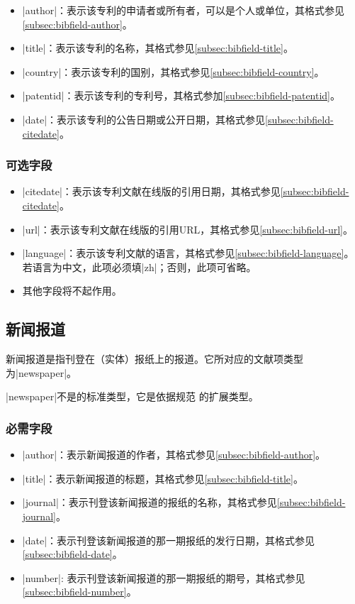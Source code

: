 \begin{itemize}
\item |author|：表示该专利的申请者或所有者，可以是个人或单位，其格式参见
  \ref{subsec:bibfield-author}。
\item |title|：表示该专利的名称，其格式参见\ref{subsec:bibfield-title}。
\item |country|：表示该专利的国别，其格式参见\ref{subsec:bibfield-country}。
\item |patentid|：表示该专利的专利号，其格式参加\ref{subsec:bibfield-patentid}。
\item |date|：表示该专利的公告日期或公开日期，其格式参见\ref{subsec:bibfield-citedate}。
\end{itemize}

\subsubsection{可选字段}

\begin{itemize}
\item |citedate|：表示该专利文献在线版的引用日期，其格式参见\ref{subsec:bibfield-citedate}。
\item |url|：表示该专利文献在线版的引用URL，其格式参见\ref{subsec:bibfield-url}。
\item |language|：表示该专利文献的语言，其格式参见\ref{subsec:bibfield-language}。
  若语言为中文，此项必须填|zh|；否则，此项可省略。
\item 其他字段将不起作用。
\end{itemize}

\subsection{新闻报道}\label{subsec:bibtype-newspaper}

新闻报道是指刊登在（实体）报纸上的报道。它所对应的{\BibTeX}文献项类型为|newspaper|。

|newspaper|不是{\BibTeX}的标准类型，它是依据规范
\cite{gbt7714-2005}的扩展类型。

\subsubsection{必需字段}

\begin{itemize}
\item |author|：表示新闻报道的作者，其格式参见\ref{subsec:bibfield-author}。
\item |title|：表示新闻报道的标题，其格式参见\ref{subsec:bibfield-title}。
\item |journal|：表示刊登该新闻报道的报纸的名称，其格式参见\ref{subsec:bibfield-journal}。
\item |date|：表示刊登该新闻报道的那一期报纸的发行日期，其格式参见\ref{subsec:bibfield-date}。
\item |number|: 表示刊登该新闻报道的那一期报纸的期号，其格式参见\ref{subsec:bibfield-number}。
\end{itemize}

